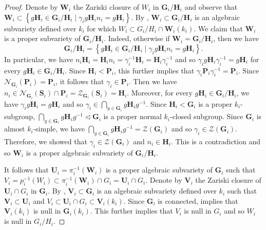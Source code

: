 \documentclass[11pt]{amsart}
\numberwithin{equation}{section}
\theoremstyle{plain}
\theoremstyle{definition}
\begin{document}
\begin{proof}
Denote by $\mathbf W_i$ the Zariski closure of $W_i$ in $\mathbf G_i/\mathbf H_i$ and observe that $\mathbf W_i \subset \left\{g\mathbf H_i \in \mathbf G_i/\mathbf H_i \mid \gamma_i g\mathbf H_i n_i = g\mathbf H_i\right\}$. By \cite[Theorem 14.4]{Bo91}, $\mathbf W_i \subset \mathbf G_i/\mathbf H_i$ is an algebraic subvariety defined over $k_i$ for which $W_i \subset G_i/H_i \cap \mathbf W_i(k_i)$. We claim that $\mathbf W_i$ is a proper subvariety of $\mathbf G_i/\mathbf H_i$. Indeed, otherwise if $\mathbf W_i = \mathbf G_i/\mathbf H_i$, then we have 
$$\mathbf G_i/\mathbf H_i = \left \{ g\mathbf H_i \in \mathbf G_i/\mathbf H_i \mid \gamma_i g\mathbf H_i n_i = g\mathbf H_i \right \}.$$
In particular, we have $n_i \mathbf H_i = \mathbf H_i n_i = \gamma_i^{-1} \mathbf H_i = \mathbf H_i \gamma_i^{-1}$ and so $\gamma_i g  \mathbf H_i \gamma_i^{-1} = g\mathbf H_i$ for every $g\mathbf H_i \in \mathbf G_i/\mathbf H_i$. Since $\mathbf H_i < \mathbf P_i$, this further implies that $\gamma_i \mathbf P_i \gamma_i^{-1} = \mathbf P_i$. Since $\mathscr N_{\mathbf G_i}(\mathbf P_i) = \mathbf P_i$, it follows that $\gamma_i \in \mathbf P_i$. Then we have $n_i \in \mathscr N_{\mathbf G_i}(\mathbf S_i) \cap \mathbf P_i = \mathscr Z_{\mathbf G_i}(\mathbf S_i) = \mathbf H_i$. Moreover, for every $g\mathbf H_i \in \mathbf G_i/\mathbf H_i$, we have $\gamma_i g \mathbf H_i = g \mathbf H_i$ and so $\gamma_i \in \bigcap_{g \in \mathbf G_i} g \mathbf H_i g^{-1}$. Since $\mathbf H_i < \mathbf G_i$ is a proper $k_i$-subgroup, $\bigcap_{g \in \mathbf G_i} g \mathbf H_i g^{-1} \lhd \mathbf G_i$ is a proper normal $k_i$-closed subgroup. Since $\mathbf G_i$ is almost $k_i$-simple, we have $\bigcap_{g \in \mathbf G_i} g \mathbf H_i g^{-1} = \mathscr Z(\mathbf G_i)$ and so $\gamma_i \in \mathscr Z(\mathbf G_i)$. Therefore, we showed that $\gamma_i \in \mathscr Z(\mathbf G_i)$ and $n_i \in \mathbf H_i$. This is a contradiction and so $\mathbf W_i$ is a proper algebraic subvariety of $\mathbf G_i/\mathbf H_i$.

It follows that $\mathbf U_i = \pi_i^{-1}(\mathbf W_i) $ is a proper algebraic subvariety of $\mathbf G_i$ such that $V_i = p_i^{-1}(W_i) \subset \pi_i^{-1}(\mathbf W_i) \cap G_i = \mathbf U_i \cap G_i$. Denote by $\mathbf V_i$ the Zariski closure of $\mathbf U_i \cap G_i$ in $\mathbf G_i$. By \cite[Theorem 14.4]{Bo91}, $\mathbf V_i \subset \mathbf G_i$ is an algebraic subvariety defined over $k_i$ such that $\mathbf V_i \subset \mathbf U_i$ and $V_i \subset \mathbf U_i \cap G_i \subset \mathbf V_i(k_i)$. Since $\mathbf G_i$ is connected, \cite[Proposition I.2.5.3$(\rm ii)$]{Ma91} implies that $\mathbf V_i(k_i)$ is null in $\mathbf G_i(k_i)$. This further implies that $V_i$ is null in $G_i$ and so $W_i$ is null in $G_i/H_i$.
\end{proof}
\end{document}
